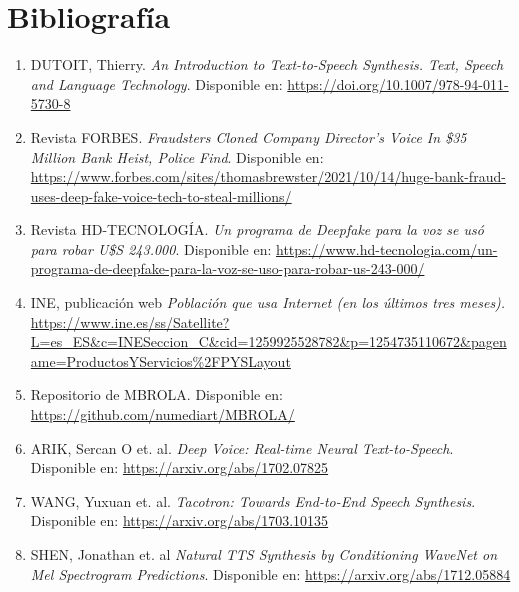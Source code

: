 \section{Bibliografía}

\begin{enumerate}


\label{RI_1}
\item{DUTOIT, Thierry. \emph{An Introduction to Text-to-Speech Synthesis. Text, Speech and Language Technology}. Disponible en: \url{https://doi.org/10.1007/978-94-011-5730-8}}

\label{RI_2}
\item{Revista FORBES. \emph{Fraudsters Cloned Company Director’s Voice In \$35 Million Bank Heist, Police Find}. Disponible en: \url{https://www.forbes.com/sites/thomasbrewster/2021/10/14/huge-bank-fraud-uses-deep-fake-voice-tech-to-steal-millions/}}

\label{RI_3}
\item{Revista HD-TECNOLOGÍA. \emph{Un programa de Deepfake para la voz se usó para robar U\$S 243.000}. Disponible en: \href{https://www.hd-tecnologia.com/un-programa-de-deepfake-para-la-voz-se-uso-para-robar-us-243-000/}{https://www.hd-tecnologia.com/un-programa-de-deepfake-para-la-voz-se-uso-para-robar-us-243-000/}}


\label{RI_4}
\item{INE, publicación web \emph{Población que usa Internet (en los últimos tres meses).} \url{https://www.ine.es/ss/Satellite?L=es_ES&c=INESeccion_C&cid=1259925528782&p=1254735110672&pagename=ProductosYServicios\%2FPYSLayout}}


\label{EA_1}
\item{Repositorio de MBROLA. Disponible en: \url{https://github.com/numediart/MBROLA/}}


\label{EA_4}
\item{ARIK, Sercan O et. al. \emph{Deep Voice: Real-time Neural Text-to-Speech}. Disponible en: \url{https://arxiv.org/abs/1702.07825}}

\label{EA_5}
\item{WANG, Yuxuan et. al. \emph{Tacotron: Towards End-to-End Speech Synthesis}. Disponible en: \url{https://arxiv.org/abs/1703.10135}}

\label{EA_6}
\item{SHEN, Jonathan et. al \emph{Natural TTS Synthesis by Conditioning WaveNet on Mel Spectrogram Predictions}. Disponible en: \url{https://arxiv.org/abs/1712.05884}}


\end{enumerate}
